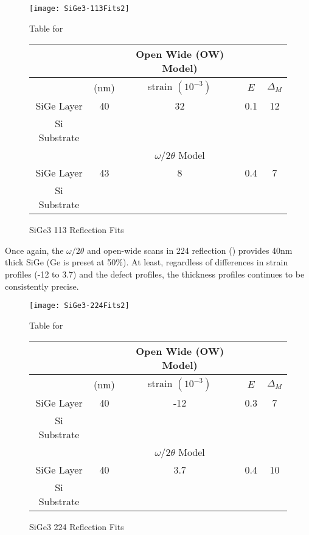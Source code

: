 \begin{figure}[hc]%
\caption{SiGe3 113 Reflection Fits}
\label{SiGe3-113}
\begin{minipage}{0.85\linewidth}
\texttt{[image: SiGe3-113Fits2]}
\end{minipage}
\begin{minipage}{\linewidth}
\centering
\vspace{10pt}
Table for \\
\vspace{5pt}
\begin{tabular}{c|cccc}
			& 	&Open Wide (OW) Model)	 \\
\hline
			&	(nm)	&	strain	 $(10^{-3})$&	$E$ & $\Delta_M$\\
\hline
SiGe Layer		&  	40	&   32	 &0.1 & 12 	\\
Si Substrate		&	\textemdash & \textemdash&\textemdash\ &\textemdash	\\
\hline
			& &$\omega/2\theta$ Model \\
\hline
SiGe Layer		&	43	& 8	&0.4&7 	\\
Si Substrate		&	\textemdash & \textemdash&\textemdash\ &\textemdash
\end{tabular}
\end{minipage}
\end{figure}

Once again, the $\omega/2\theta$  and open-wide scans in 224 reflection () provides 40nm thick SiGe (Ge is preset at 50\%).  At least, regardless of differences in strain profiles (-12 to 3.7) and the defect profiles, the thickness profiles continues to be consistently precise.

\begin{figure}[hc]%
\caption{SiGe3 224 Reflection Fits}
\label{SiGe3-224}
\begin{minipage}{0.85\linewidth}
\texttt{[image: SiGe3-224Fits2]}
\end{minipage}
\begin{minipage}{\linewidth}
\centering
\vspace{10pt}
Table for \\
\vspace{5pt}
\begin{tabular}{c|cccc}
			& 	&Open Wide (OW) Model)	 \\
\hline
			&	(nm)	&	strain	 $(10^{-3})$&	$E$ &  $\Delta_M$\\
\hline
SiGe Layer		&  	40	&      -12	 &0.3 & 7	\\
Si Substrate		&	\textemdash & \textemdash&\textemdash\ &\textemdash	\\
\hline
			& &$\omega/2\theta$ Model \\
\hline
SiGe Layer		&	40	& 3.7	&0.4	&10	\\
Si Substrate		&	\textemdash & \textemdash&\textemdash\ &\textemdash
\end{tabular}
\end{minipage}
\end{figure}




